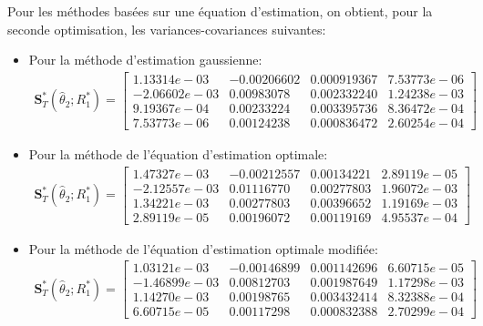 Pour les méthodes basées sur une équation d'estimation, on obtient,
pour la seconde optimisation, les variances-covariances suivantes:
\begin{itemize}
\item Pour la méthode d'estimation gaussienne:
  \begin{align}
    \label{eq:matvcov2R1-gauss}
    \mathbf{S}_T^{*}(\hat\theta_2;R_1^{*}) = \begin{bmatrix}
      1.13314e-03& -0.00206602& 0.000919367& 7.53773e-06\\
      -2.06602e-03 & 0.00983078& 0.002332240 &1.24238e-03\\
      9.19367e-04 & 0.00233224& 0.003395736& 8.36472e-04\\
      7.53773e-06 & 0.00124238& 0.000836472& 2.60254e-04
    \end{bmatrix}
  \end{align}
\item Pour la méthode de l'équation d'estimation optimale:
  \begin{align}
    \label{eq:matvcov2R1-ee}
    \mathbf{S}_T^{*}(\hat\theta_2;R_1^{*}) = \begin{bmatrix}
      1.47327e-03& -0.00212557& 0.00134221& 2.89119e-05\\
      -2.12557e-03 & 0.01116770 &0.00277803& 1.96072e-03\\
      1.34221e-03 & 0.00277803& 0.00396652& 1.19169e-03 \\
      2.89119e-05 & 0.00196072& 0.00119169& 4.95537e-04
    \end{bmatrix}
  \end{align}
\item Pour la méthode de l'équation d'estimation optimale modifiée:
  \begin{align}
    \label{eq:matvcov2R1-eemod}
    \mathbf{S}_T^{*}(\hat\theta_2;R_1^{*}) = \begin{bmatrix}
      1.03121e-03& -0.00146899& 0.001142696& 6.60715e-05\\
      -1.46899e-03 & 0.00812703 &0.001987649& 1.17298e-03\\
      1.14270e-03 & 0.00198765& 0.003432414& 8.32388e-04\\
      6.60715e-05 & 0.00117298& 0.000832388& 2.70299e-04
    \end{bmatrix}
  \end{align}
\end{itemize}


